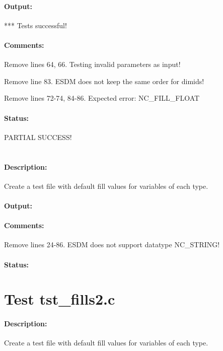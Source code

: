 \paragraph{Output:} *** Tests successful!

\paragraph{Comments:} Remove lines 64, 66. Testing invalid parameters as input!

Remove line 83. ESDM does not keep the same order for dimids!

Remove lines 72-74, 84-86. Expected error: NC\_FILL\_FLOAT

\paragraph{Status:} PARTIAL SUCCESS!

\section{}

\paragraph{Description:} Create a test file with default fill values for variables of each type.

\paragraph{Output:}

\paragraph{Comments:} Remove lines 24-86. ESDM does not support datatype NC\_STRING!

\paragraph{Status:}

\section{Test tst\_fills2.c}

\paragraph{Description:} Create a test file with default fill values for variables of each type.

